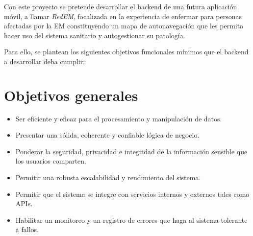 
Con este proyecto se pretende desarrollar el backend de una futura aplicación móvil, a llamar \emph{RedEM}, focalizada en la experiencia de enfermar para personas afectadas por la EM constituyendo un mapa de autonavegación que les permita hacer uso del sistema sanitario y autogestionar su patología.

Para ello, se plantean los siguientes objetivos funcionales mínimos que el backend a desarrollar deba cumplir:

\section{Objetivos generales}

\begin{itemize}
    \item Ser eficiente y eficaz para el procesamiento y manipulación de datos.
    \item Presentar una sólida, coherente y confiable lógica de negocio. 
    \item Ponderar la seguridad, privacidad e integridad de la información sensible que los usuarios comparten.
    \item Permitir una robusta escalabilidad y rendimiento del sistema.
    \item Permitir que el sistema se integre con servicios internos y externos tales como APIs.
    \item Habilitar un monitoreo y un registro de errores que haga al sistema tolerante a fallos. 
\end{itemize}

